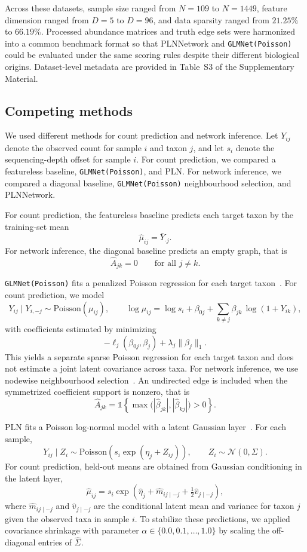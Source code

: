 \documentclass[Review,doublespace,sageh,times]{sagej}
\begin{document}
Across these datasets, sample size ranged from $N=109$ to $N=1449$, feature dimension ranged from $D=5$ to $D=96$, and data sparsity ranged from $21.25\%$ to $66.19\%$.
Processed abundance matrices and truth edge sets were harmonized into a common benchmark format so that PLNNetwork and \texttt{GLMNet(Poisson)} could be evaluated under the same scoring rules despite their different biological origins.
Dataset-level metadata are provided in Table~S3 of the Supplementary Material.



\subsection{Competing methods}
\label{subsec:algorithms}

We used different methods for count prediction and network inference.
Let $Y_{ij}$ denote the observed count for sample $i$ and taxon $j$, and let $s_i$ denote the sequencing-depth offset for sample $i$.
For count prediction, we compared a featureless baseline, \texttt{GLMNet(Poisson)}, and PLN.
For network inference, we compared a diagonal baseline, \texttt{GLMNet(Poisson)} neighbourhood selection, and PLNNetwork.

For count prediction, the featureless baseline predicts each target taxon by the training-set mean
\[
\hat{\mu}_{ij} = \bar{Y}_{\cdot j}.
\]
For network inference, the diagonal baseline predicts an empty graph, that is
\[
\hat{A}_{jk} = 0 \qquad \text{for all } j \neq k.
\]

\texttt{GLMNet(Poisson)} fits a penalized Poisson regression for each target taxon~\citep{Friedman2010}.
For count prediction, we model
\[
Y_{ij} \mid Y_{i,-j} \sim \mathrm{Poisson}(\mu_{ij}),
\qquad
\log \mu_{ij} = \log s_i + \beta_{0j} + \sum_{k \neq j} \beta_{jk}\,\log(1 + Y_{ik}),
\]
with coefficients estimated by minimizing
\[
-\ell_j(\beta_{0j}, \beta_j) + \lambda_j \lVert \beta_j \rVert_1.
\]
This yields a separate sparse Poisson regression for each target taxon and does not estimate a joint latent covariance across taxa.
For network inference, we use nodewise neighbourhood selection~\citep{Meinshausen2006}.
An undirected edge is included when the symmetrized coefficient support is nonzero, that is
\[
\hat{A}_{jk} = \mathbb{1}\!\left\{\max\!\big(|\hat{\beta}_{jk}|, |\hat{\beta}_{kj}|\big) > 0\right\}.
\]

PLN fits a Poisson log-normal model with a latent Gaussian layer~\citep{aitchison1989multivariate,Chiquet2021}.
For each sample,
\[
Y_{ij} \mid Z_i \sim \mathrm{Poisson}\!\left(s_i \exp(\eta_j + Z_{ij})\right),
\qquad
Z_i \sim \mathcal{N}(0, \Sigma).
\]
For count prediction, held-out means are obtained from Gaussian conditioning in the latent layer,
\[
\hat{\mu}_{ij}
=
s_i \exp\!\left(\hat{\eta}_j + \hat{m}_{ij \mid -j} + \tfrac{1}{2}\hat{v}_{j \mid -j}\right),
\]
where $\hat{m}_{ij \mid -j}$ and $\hat{v}_{j \mid -j}$ are the conditional latent mean and variance for taxon $j$ given the observed taxa in sample $i$.
To stabilize these predictions, we applied covariance shrinkage with parameter $\alpha \in \{0.0, 0.1, \ldots, 1.0\}$ by scaling the off-diagonal entries of $\hat{\Sigma}$.
\end{document}
